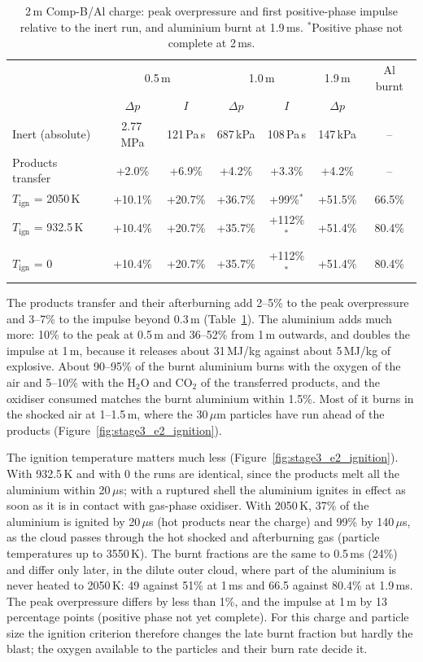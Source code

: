\documentclass{article}
\begin{document}
\begin{table}[htbp]
    \centering
    \footnotesize
    \caption{2\,m Comp-B/Al charge: peak overpressure and first positive-phase impulse relative to the inert run, and aluminium burnt at 1.9\,ms. $^*$Positive phase not complete at 2\,ms.}
    \label{tab:e2}
    \begin{tabular}{lcccccc}
        \toprule
        & \multicolumn{2}{c}{0.5\,m} & \multicolumn{2}{c}{1.0\,m} & 1.9\,m & Al burnt \\
        & $\Delta p$ & $I$ & $\Delta p$ & $I$ & $\Delta p$ & \\
        \midrule
        Inert (absolute) & 2.77\,MPa & 121\,Pa\,s & 687\,kPa & 108\,Pa\,s & 147\,kPa & -- \\
        Products transfer & +2.0\% & +6.9\% & +4.2\% & +3.3\% & +4.2\% & -- \\
        $T_\text{ign}$ = 2050\,K & +10.1\% & +20.7\% & +36.7\% & +99\%$^*$ & +51.5\% & 66.5\% \\
        $T_\text{ign}$ = 932.5\,K & +10.4\% & +20.7\% & +35.7\% & +112\%$^*$ & +51.4\% & 80.4\% \\
        $T_\text{ign}$ = 0 & +10.4\% & +20.7\% & +35.7\% & +112\%$^*$ & +51.4\% & 80.4\% \\
        \bottomrule
    \end{tabular}
\end{table}

The products transfer and their afterburning add 2--5\% to the peak overpressure and 3--7\% to the impulse beyond 0.3\,m (Table~\ref{tab:e2}). The aluminium adds much more: 10\% to the peak at 0.5\,m and 36--52\% from 1\,m outwards, and doubles the impulse at 1\,m, because it releases about 31\,MJ/kg against about 5\,MJ/kg of explosive. About 90--95\% of the burnt aluminium burns with the oxygen of the air and 5--10\% with the H$_2$O and CO$_2$ of the transferred products, and the oxidiser consumed matches the burnt aluminium within 1.5\%. Most of it burns in the shocked air at 1--1.5\,m, where the 30\,$\mu$m particles have run ahead of the products (Figure~\ref{fig:stage3_e2_ignition}).

The ignition temperature matters much less (Figure~\ref{fig:stage3_e2_ignition}). With 932.5\,K and with 0 the runs are identical, since the products melt all the aluminium within 20\,$\mu$s; with a ruptured shell the aluminium ignites in effect as soon as it is in contact with gas-phase oxidiser. With 2050\,K, 37\% of the aluminium is ignited by 20\,$\mu$s (hot products near the charge) and 99\% by 140\,$\mu$s, as the cloud passes through the hot shocked and afterburning gas (particle temperatures up to 3550\,K). The burnt fractions are the same to 0.5\,ms (24\%) and differ only later, in the dilute outer cloud, where part of the aluminium is never heated to 2050\,K: 49 against 51\% at 1\,ms and 66.5 against 80.4\% at 1.9\,ms. The peak overpressure differs by less than 1\%, and the impulse at 1\,m by 13 percentage points (positive phase not yet complete). For this charge and particle size the ignition criterion therefore changes the late burnt fraction but hardly the blast; the oxygen available to the particles and their burn rate decide it.
\end{document}
